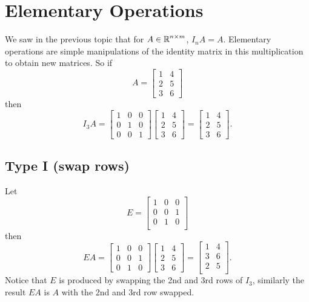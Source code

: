 \section{Elementary Operations}
We saw in the previous topic that for $A\in\operatorname{\mathbb{R}}^{n\times m}$, $I_n A = A$. 
Elementary operations are simple manipulations of the identity matrix in this multiplication to obtain new matrices. 
So if \[A = \left[\begin{matrix}1 & 4 \\ 2 & 5\\ 3 & 6\end{matrix}\right]\]
then \[I_3A = \left[\begin{matrix}1 & 0 & 0\\ 0 & 1 & 0\\ 0 & 0 & 1\end{matrix}\right]\left[\begin{matrix}1 & 4 \\ 2 & 5\\ 3 & 6\end{matrix}\right] = \left[\begin{matrix}1 & 4 \\ 2 & 5\\ 3 & 6\end{matrix}\right].\]

\subsection{Type I (swap rows)}
Let 
\[E = \left[\begin{matrix}1 & 0 & 0\\ 0 & 0 & 1\\ 0 & 1 & 0\\\end{matrix}\right]\]
then
 \[EA = \left[\begin{matrix}1 & 0 & 0\\ 0 & 0 & 1\\ 0 & 1 & 0\end{matrix}\right]\left[\begin{matrix}1 & 4 \\ 2 & 5\\ 3 & 6\end{matrix}\right] = \left[\begin{matrix}1 & 4 \\  3 & 6\\2 & 5\\\end{matrix}\right].\]
Notice that $E$ is produced by swapping the 2nd and 3rd rows of $I_3$, 
similarly the result $EA$ is $A$ with the 2nd and 3rd row swapped. 

